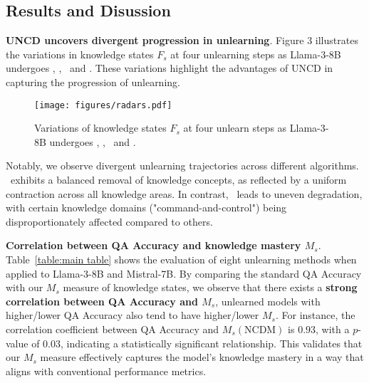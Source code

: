 \subsection{Results and Disussion} 

\noindent
\textbf{UNCD uncovers divergent progression in unlearning}.
Figure 3 illustrates the variations in knowledge states   $F_s$ at four unlearning steps as Llama-3-8B undergoes \GAGD, \NPOGD, \GAKL\ and \NPOKL. These variations highlight the advantages of UNCD in capturing the progression of unlearning. 

\begin{wrapfigure}{r}{0.48\textwidth}
    \vspace{-10pt}
    \texttt{[image: figures/radars.pdf]}
    \caption{Variations of knowledge states $F_s$ at four unlearn steps as Llama-3-8B undergoes \GAGD, \NPOGD, \GAKL\ and \NPOKL.}
    \label{fig:radar chart}
     \vspace{-15pt}
\end{wrapfigure}


Notably, we observe  divergent unlearning trajectories across different algorithms. \NPOGD\ exhibits a balanced removal of knowledge concepts, as reflected by a uniform contraction across all knowledge areas. In contrast, \GAGD\ leads to uneven degradation, with certain knowledge domains (\eg "command-and-control") being disproportionately affected compared to others.



\noindent
\textbf{Correlation  between QA Accuracy and knowledge mastery $M_s$}.
Table~\ref{table:main table} shows the evaluation of eight unlearning methods when applied to Llama-3-8B and Mistral-7B. By comparing the standard QA Accuracy with our $M_s$ measure of knowledge states, we observe that 
there exists a \textbf{strong correlation between QA Accuracy and $M_s$}, \eg unlearned models with higher/lower QA Accuracy also tend to have higher/lower  $M_s$.  {For instance, the correlation coefficient between QA Accuracy and $M_s(\text{NCDM})$ is $0.93$, with a $p$-value of $0.03$, indicating a statistically significant relationship.} This validates that our $M_s$ measure effectively captures the model’s knowledge mastery in a way that aligns with conventional performance metrics.

